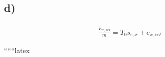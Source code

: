

\subsection*{d)}

\begin{align*}
    \frac{\dot{E}_{x, vel}}{m} = T_0 \dot{s}_{e, x} + e_{x, vel}
\end{align*}

``````latex